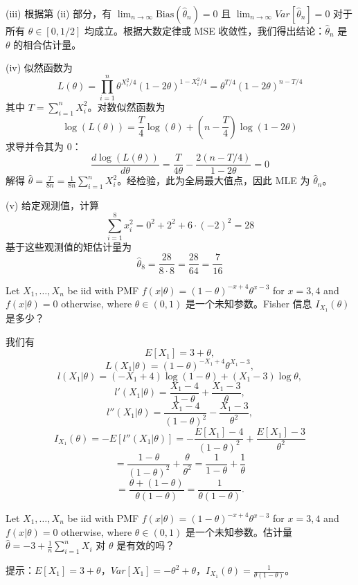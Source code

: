 \begin{questions}
\begin{solution}
(iii) 根据第 (ii) 部分，有 $\lim_{n \to \infty} \text{Bias}(\hat{\theta}_n) = 0$ 且 $\lim_{n \to \infty} Var[\hat{\theta}_n] = 0$ 对于所有 $\theta \in [0, 1/2]$ 均成立。根据大数定律或 MSE 收敛性，我们得出结论：$\hat{\theta}_n$ 是 $\theta$ 的相合估计量。

(iv) 似然函数为
\[
L(\theta) = \prod_{i=1}^n \theta^{X_i^2/4} (1 - 2\theta)^{1 - X_i^2/4} = \theta^{T/4} (1 - 2\theta)^{n - T/4}
\]
其中 $T = \sum_{i=1}^n X_i^2$。对数似然函数为
\[
\log(L(\theta)) = \frac{T}{4} \log(\theta) + \left( n - \frac{T}{4} \right) \log(1 - 2\theta)
\]
求导并令其为 0：
\[
\frac{d \log(L(\theta))}{d\theta} = \frac{T}{4\theta} - \frac{2(n - T/4)}{1 - 2\theta} = 0
\]
解得 $\hat{\theta} = \frac{T}{8n} = \frac{1}{8n} \sum_{i=1}^n X_i^2$。经检验，此为全局最大值点，因此 MLE 为 $\hat{\theta}_n$。

(v) 给定观测值，计算
\[
\sum_{i=1}^8 x_i^2 = 0^2 + 2^2 + 6 \cdot (-2)^2 = 28
\]
基于这些观测值的矩估计量为
\[
\hat{\theta}_8 = \frac{28}{8 \cdot 8} = \frac{28}{64} = \frac{7}{16}
\]
\end{solution}

\question Let $X_1, \dots, X_n$ be iid with PMF $f(x|\theta) = (1 - \theta)^{-x+4} \theta^{x-3}$ for $x = 3, 4$ and $f(x|\theta) = 0$ otherwise, where $\theta \in (0, 1)$ 是一个未知参数。Fisher 信息 $I_{X_1}(\theta)$ 是多少？

\begin{solution}
我们有
\[
E[X_1] = 3 + \theta,
\]
\[
L(X_1|\theta) = (1 - \theta)^{-X_1+4} \theta^{X_1-3},
\]
\[
l(X_1|\theta) = (-X_1 + 4) \log(1 - \theta) + (X_1 - 3) \log \theta,
\]
\[
l'(X_1|\theta) = \frac{X_1 - 4}{1 - \theta} + \frac{X_1 - 3}{\theta},
\]
\[
l''(X_1|\theta) = \frac{X_1 - 4}{(1 - \theta)^2} - \frac{X_1 - 3}{\theta^2},
\]
\[
I_{X_1}(\theta) = -E[l''(X_1|\theta)] = -\frac{E[X_1] - 4}{(1 - \theta)^2} + \frac{E[X_1] - 3}{\theta^2}
\]
\[
= \frac{1 - \theta}{(1 - \theta)^2} + \frac{\theta}{\theta^2} = \frac{1}{1 - \theta} + \frac{1}{\theta}
\]
\[
= \frac{\theta + (1 - \theta)}{\theta(1 - \theta)} = \frac{1}{\theta(1 - \theta)}.
\]
\end{solution}

\question Let $X_1, \dots, X_n$ be iid with PMF $f(x|\theta) = (1 - \theta)^{-x+4} \theta^{x-3}$ for $x = 3, 4$ and $f(x|\theta) = 0$ otherwise, where $\theta \in (0, 1)$ 是一个未知参数。估计量 $\hat{\theta} = -3 + \frac{1}{n} \sum_{i=1}^n X_i$ 对 $\theta$ 是有效的吗？

提示：$E[X_1] = 3 + \theta$，$Var[X_1] = -\theta^2 + \theta$，$I_{X_1}(\theta) = \frac{1}{\theta(1 - \theta)}$。


\end{questions}

